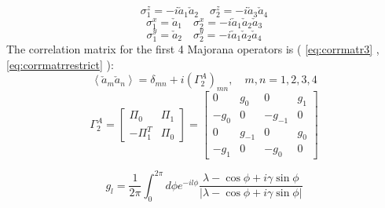 \documentclass[12pt,a4paper]{book}
\theoremstyle{definition}
\begin{document}
\begin{equation}
	\sigma_1^z=-i\check{a}_1\check{a}_2 \quad
	\sigma_2^z=-i\check{a}_3\check{a}_4
\end{equation}
\begin{equation}
	\sigma_1^x=\check{a}_1 \quad \sigma_2^x=-i\check{a}_1\check{a}_2\check{a}_3
\end{equation}
\begin{equation}
	\sigma_1^y=\check{a}_2 \quad \sigma_2^y=-i\check{a}_1\check{a}_2\check{a}_4
\end{equation}
The correlation matrix for the first 4 Majorana operators is ( \ref{eq:corrmatr3} , \ref{eq:corrmatrrestrict} ):
\begin{equation}\label{eq:corrmatr2sites1}
	\left\langle\check{a}_{m} \check{a}_{n}\right\rangle=\delta_{m n}+i\left(\Gamma_{2}^{A}\right)_{m n}, \quad m, n=1,2,3,4
\end{equation}
\begin{equation}\label{eq:corrmatr2sites2}
	\Gamma_{2}^{A}=\left[\begin{array}{cc}
		\Pi_0 & \Pi_1 \\
		-\Pi_1^T & \Pi_0
	\end{array}\right]
	=\left[\begin{array}{cccc}
		0 & g_0 & 0& g_1\\
		-g_0 & 0 &-g_{-1} & 0\\
		0&g_{-1}&0&g_0\\
		-g_1&0&-g_0& 0
	\end{array}\right]
\end{equation}

\begin{equation}
	g_l=\frac{1}{2 \pi} \int_{0}^{2 \pi} d \phi e^{-i l \phi} \frac{\lambda-\cos \phi+i \gamma \sin \phi}{|\lambda-\cos\phi +i  \gamma \sin \phi|}
\end{equation}
\end{document}
